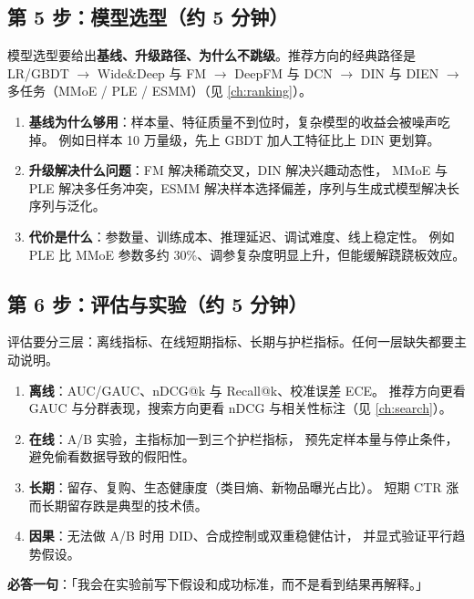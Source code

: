\subsection{第 5 步：模型选型（约 5 分钟）}

模型选型要给出\textbf{基线、升级路径、为什么不跳级}。推荐方向的经典路径是
LR/GBDT $\to$ Wide\&Deep 与 FM $\to$ DeepFM 与 DCN $\to$ DIN 与 DIEN $\to$
多任务（MMoE / PLE / ESMM）（见 \cref{ch:ranking}）。

\begin{interview}[选型的三级论证]
\begin{enumerate}
  \item \textbf{基线为什么够用}：样本量、特征质量不到位时，复杂模型的收益会被噪声吃掉。
        例如日样本 10 万量级，先上 GBDT 加人工特征比上 DIN 更划算。
  \item \textbf{升级解决什么问题}：FM 解决稀疏交叉，DIN 解决兴趣动态性，
        MMoE 与 PLE 解决多任务冲突，ESMM 解决样本选择偏差，序列与生成式模型解决长序列与泛化。
  \item \textbf{代价是什么}：参数量、训练成本、推理延迟、调试难度、线上稳定性。
        例如 PLE 比 MMoE 参数多约 30\%、调参复杂度明显上升，但能缓解跷跷板效应。
\end{enumerate}
\end{interview}

\subsection{第 6 步：评估与实验（约 5 分钟）}

评估要分三层：离线指标、在线短期指标、长期与护栏指标。任何一层缺失都要主动说明。

\begin{interview}[评估方案的完整清单]
\begin{enumerate}
  \item \textbf{离线}：AUC/GAUC、nDCG@k 与 Recall@k、校准误差 ECE。
        推荐方向更看 GAUC 与分群表现，搜索方向更看 nDCG 与相关性标注（见 \cref{ch:search}）。
  \item \textbf{在线}：A/B 实验，主指标加一到三个护栏指标，
        预先定样本量与停止条件，避免偷看数据导致的假阳性。
  \item \textbf{长期}：留存、复购、生态健康度（类目熵、新物品曝光占比）。
        短期 CTR 涨而长期留存跌是典型的技术债。
  \item \textbf{因果}：无法做 A/B 时用 DID、合成控制或双重稳健估计，
        并显式验证平行趋势假设。
\end{enumerate}
\textbf{必答一句}：「我会在实验前写下假设和成功标准，而不是看到结果再解释。」
\end{interview}

